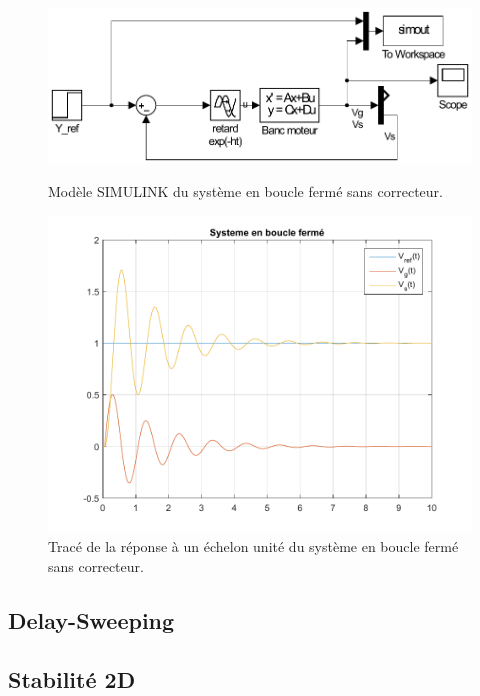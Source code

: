 \begin{figure}[!ht]
\begin{minipage}{.5\textwidth}
\centering
\includegraphics[width=.8\textwidth]{./I/images/BFsimple_simulink.pdf}
\caption{\label{fig:simulink_BFsimple}Modèle SIMULINK du système en boucle fermé sans correcteur.}
\end{minipage}\hfill
\begin{minipage}{.5\textwidth}
\centering
\includegraphics[width=.8\textwidth]{./I/images/BFsimple_plot.pdf}
\caption{\label{fig:plot_	BFsimple}Tracé de la réponse à un échelon unité du système en boucle fermé sans correcteur.}
\end{minipage}
\end{figure}
		\subsection{Delay-Sweeping}


		
		\subsection{Stabilité 2D}
		


